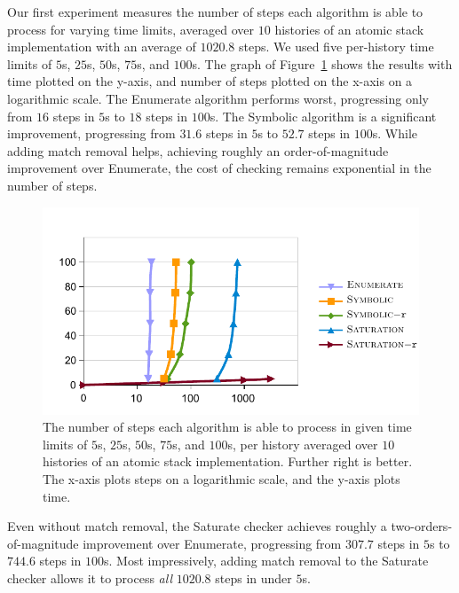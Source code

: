 Our first experiment measures the number of steps each algorithm is able to
process for varying time limits, averaged over $10$ histories of an atomic
stack implementation with an average of $1020.8$ steps. We used five
per-history time limits of $5$s, $25$s, $50$s, $75$s, and $100$s. The graph of
Figure~\ref{fig:steprace} shows the results with time plotted on the y-axis,
and number of steps plotted on the x-axis on a logarithmic scale. The {\sc
Enumerate} algorithm performs worst, progressing only from $16$ steps in $5$s to
$18$ steps in $100$s. The {\sc Symbolic} algorithm is a significant improvement,
progressing from $31.6$ steps in $5$s to $52.7$ steps in $100$s. While adding match
removal helps, achieving roughly an order-of-magnitude improvement over {\sc
Enumerate}, the cost of checking remains exponential in the number of steps.

\begin{figure}[t]
  \centering
  \includegraphics[width=\linewidth]{figures/chart_efficiency}
  \caption{The number of steps each algorithm is able to process in given time
  limits of $5$s, $25$s, $50$s, $75$s, and $100$s, per history averaged over
  $10$ histories of an atomic stack implementation. Further right is better.
  The x-axis plots steps on a logarithmic scale, and the y-axis plots time.}
  \label{fig:steprace}
\end{figure}

Even without match removal, the {\sc Saturate} checker achieves roughly a
two-orders-of-magnitude improvement over {\sc Enumerate}, progressing from $307.7$
steps in $5$s to $744.6$ steps in $100$s. Most impressively, adding match removal
to the {\sc Saturate} checker allows it to process \emph{all} $1020.8$ steps in
under $5$s.

